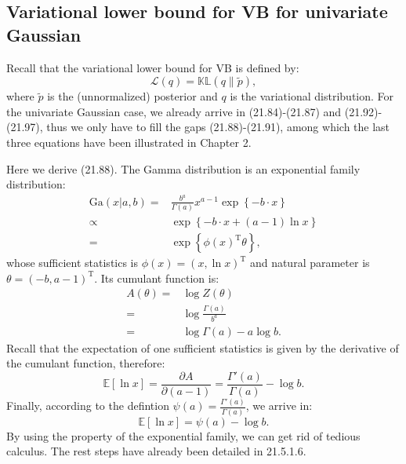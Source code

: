 \documentclass[UTF8]{ctexart}
\begin{document}
\subsection{Variational lower bound for VB for univariate Gaussian}
Recall that the variational lower bound for VB is defined by:
$$\mathcal{L}(q)=\mathbb{KL}(q\| \tilde{p}),$$
where $\tilde{p}$ is the (unnormalized) posterior and $q$ is the variational distribution. 
For the univariate Gaussian case, we already arrive in (21.84)-(21.87) and (21.92)-(21.97), thus we only have to fill the gaps (21.88)-(21.91), among which the last three equations have been illustrated in Chapter 2. 

Here we derive (21.88).
The Gamma distribution is an exponential family distribution:
$$
\begin{aligned}
\text{Ga}(x|a,b)=&\frac{b^{a}}{\Gamma(a)}x^{a-1}\exp\left\{-b\cdot x \right\} \\
\propto& \exp\left\{-b\cdot x+(a-1) \ln x  \right\} \nonumber\\
=&\exp\left\{ \phi(x)^{\text{T}}\theta \right\},
\end{aligned}
$$
whose sufficient statistics is $\phi(x)=(x,\ln x)^{\text{T}}$ and natural parameter is $\theta = (-b,a-1)^{\text{T}}$. 
Its cumulant function is:
\begin{align}
A(\theta)=& \log Z(\theta)\nonumber \\
=&\log \frac{\Gamma(a)}{b^{a}} \nonumber \\
=&\log \Gamma(a) - a \log b. \nonumber
\end{align}
Recall that the expectation of one sufficient statistics is given by the derivative of the cumulant function, therefore:
$$\mathbb{E}[\ln x] = \frac{\partial A}{\partial (a-1)} = \frac{\Gamma'(a)}{\Gamma(a)}-\log b.$$
Finally, according to the defintion $\psi(a)=\frac{\Gamma'(a)}{\Gamma(a)}$, we arrive in:
$$\mathbb{E}[\ln x] = \psi(a)-\log b.$$
By using the property of the exponential family, we can get rid of tedious calculus. 
The rest steps have already been detailed in 21.5.1.6.
\end{document}
